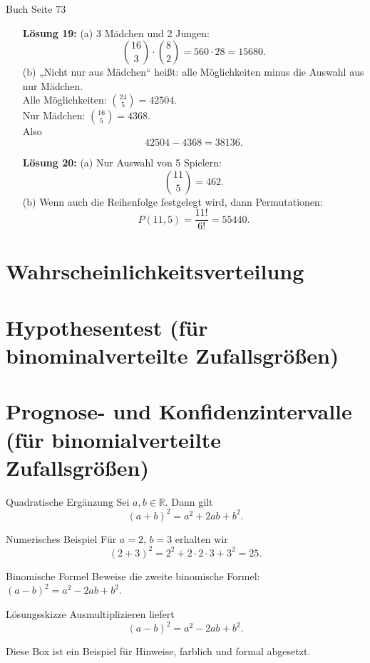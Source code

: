 \documentclass[11pt,a4paper,oneside]{article}
\begin{document}
\begin{loesung}{Buch Seite 73}
\begin{itemize}[left=20mm]
			\item[\textbf{Lösung 19:}] 
			(a) 3 Mädchen und 2 Jungen: 
			\[ \binom{16}{3} \cdot \binom{8}{2} = 560 \cdot 28 = 15680. \]
			(b) „Nicht nur aus Mädchen“ heißt: alle Möglichkeiten minus die Auswahl aus nur Mädchen. \\
			Alle Möglichkeiten: \( \binom{24}{5} = 42504 \). \\
			Nur Mädchen: \( \binom{16}{5} = 4368 \). \\
			Also 
			\[ 42504 - 4368 = 38136. \]
			
			\item[\textbf{Lösung 20:}] 
			(a) Nur Auswahl von 5 Spielern: 
			\[ \binom{11}{5} = 462. \]
			(b) Wenn auch die Reihenfolge festgelegt wird, dann Permutationen: 
			\[ P(11,5) = \frac{11!}{6!} = 55440. \]
		\end{itemize}
	\end{loesung}
	
	\newpage
	
	
	\section{Wahrscheinlichkeitsverteilung}
	
	\section{Hypothesentest (für binominalverteilte Zufallsgrößen)}
	
	\section{Prognose- und Konfidenzintervalle (für binomialverteilte Zufallsgrößen)}
	
	\newpage
	
	
	\begin{theo}{Quadratische Ergänzung}
		Sei \(a,b\in \mathbb{R}\). Dann gilt
		\[
		(a+b)^2 = a^2 + 2ab + b^2.
		\]
	\end{theo}
	
	\begin{exem}{Numerisches Beispiel}
		Für \(a=2\), \(b=3\) erhalten wir
		\[
		(2+3)^2 = 2^2 + 2\cdot 2\cdot 3 + 3^2 = 25.
		\]
	\end{exem}
	
	\begin{aufgabe}{Binomische Formel}
		Beweise die zweite binomische Formel: \((a-b)^2 = a^2 - 2ab + b^2\).
	\end{aufgabe}
	
	\begin{loesung}{Lösungsskizze}
		Ausmultiplizieren liefert
		\[
		(a-b)^2 = a^2 - 2ab + b^2.
		\]
	\end{loesung}
	
	\begin{infobox}
		Diese Box ist ein Beispiel für Hinweise, farblich und formal abgesetzt.
	\end{infobox}
	
\end{document}
